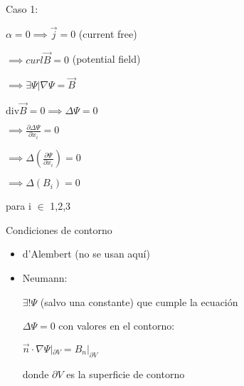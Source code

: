 \documentclass[10pt]{book}
\begin{document}
Caso 1:

$\alpha = 0 \implies \vec{j} = 0$ (current free)

$\implies curl \vec{B} = 0$ (potential field)

$\implies \exists \Psi | \nabla \Psi = \vec{B}$

$\text{div} \vec{B} = 0 \implies \Delta \Psi = 0$

$\implies \frac{\partial \Delta \Psi}{\partial x_i} = 0$ 

$\implies \Delta(\frac{\partial  \Psi}{\partial x_i}) = 0$ 

$\implies \Delta(B_i) = 0$ 

para  i $\in$ {1,2,3}

Condiciones de contorno

\begin{itemize}

\item d'Alembert (no se usan aquí)

\item Neumann:

$\exists! \Psi$ (salvo una constante) que cumple la ecuación

 $\Delta \Psi = 0$ con   valores en el contorno:

$\vec{n} \cdot \nabla \Psi |_{\partial V} = B_n |_{\partial V}$

donde $\partial V$ es la superficie de contorno

\end{itemize}
\end{document}
